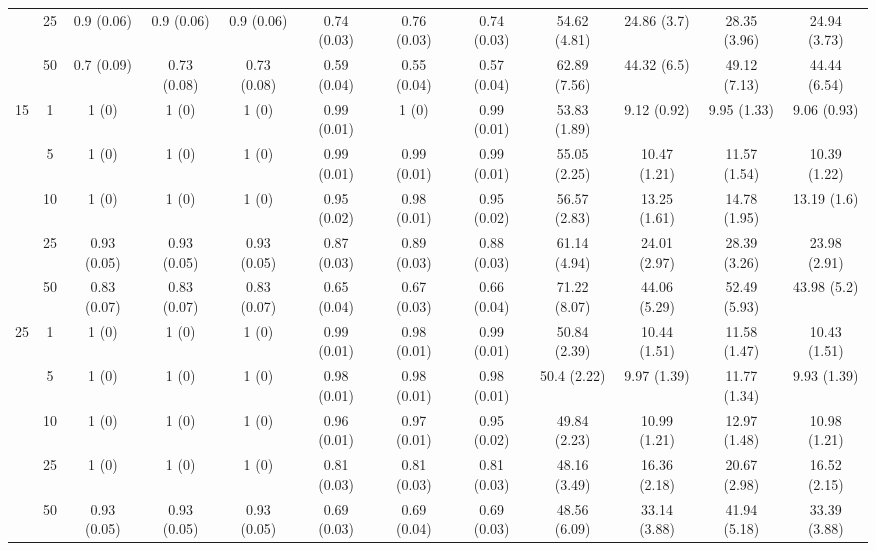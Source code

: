 \documentclass[10pt]{article}
\theoremstyle{definition}
\begin{document}
\begin{table}[H]
\begin{center}
{\begin{tabular}{cc|ccc|ccc|cccc|}
  & 25  & 0.9 (0.06) & 0.9 (0.06) & 0.9 (0.06) & 0.74 (0.03) & 0.76 (0.03) & 0.74 (0.03) & 54.62 (4.81) & 24.86 (3.7) & 28.35 (3.96) & 24.94 (3.73) \\ 
  & 50  & 0.7 (0.09) & 0.73 (0.08) & 0.73 (0.08) & 0.59 (0.04) & 0.55 (0.04) & 0.57 (0.04) & 62.89 (7.56) & 44.32 (6.5) & 49.12 (7.13) & 44.44 (6.54) \\[.3cm] 
 \multirow{5}{*}{15} & 1  & 1 (0) & 1 (0) & 1 (0) & 0.99 (0.01) & 1 (0) & 0.99 (0.01) & 53.83 (1.89) & 9.12 (0.92) & 9.95 (1.33) & 9.06 (0.93) \\ 
  & 5  & 1 (0) & 1 (0) & 1 (0) & 0.99 (0.01) & 0.99 (0.01) & 0.99 (0.01) & 55.05 (2.25) & 10.47 (1.21) & 11.57 (1.54) & 10.39 (1.22) \\ 
  & 10  & 1 (0) & 1 (0) & 1 (0) & 0.95 (0.02) & 0.98 (0.01) & 0.95 (0.02) & 56.57 (2.83) & 13.25 (1.61) & 14.78 (1.95) & 13.19 (1.6) \\ 
  & 25  & 0.93 (0.05) & 0.93 (0.05) & 0.93 (0.05) & 0.87 (0.03) & 0.89 (0.03) & 0.88 (0.03) & 61.14 (4.94) & 24.01 (2.97) & 28.39 (3.26) & 23.98 (2.91) \\ 
  & 50  & 0.83 (0.07) & 0.83 (0.07) & 0.83 (0.07) & 0.65 (0.04) & 0.67 (0.03) & 0.66 (0.04) & 71.22 (8.07) & 44.06 (5.29) & 52.49 (5.93) & 43.98 (5.2) \\[.3cm] 
 \multirow{5}{*}{25} & 1  & 1 (0) & 1 (0) & 1 (0) & 0.99 (0.01) & 0.98 (0.01) & 0.99 (0.01) & 50.84 (2.39) & 10.44 (1.51) & 11.58 (1.47) & 10.43 (1.51) \\ 
  & 5  & 1 (0) & 1 (0) & 1 (0) & 0.98 (0.01) & 0.98 (0.01) & 0.98 (0.01) & 50.4 (2.22) & 9.97 (1.39) & 11.77 (1.34) & 9.93 (1.39) \\ 
  & 10  & 1 (0) & 1 (0) & 1 (0) & 0.96 (0.01) & 0.97 (0.01) & 0.95 (0.02) & 49.84 (2.23) & 10.99 (1.21) & 12.97 (1.48) & 10.98 (1.21) \\ 
  & 25  & 1 (0) & 1 (0) & 1 (0) & 0.81 (0.03) & 0.81 (0.03) & 0.81 (0.03) & 48.16 (3.49) & 16.36 (2.18) & 20.67 (2.98) & 16.52 (2.15) \\ 
    & 50  & 0.93 (0.05) & 0.93 (0.05) & 0.93 (0.05) & 0.69 (0.03) & 0.69 (0.04) & 0.69 (0.03) & 48.56 (6.09) & 33.14 (3.88) & 41.94 (5.18) & 33.39 (3.88) \\
\end{tabular}}
   \end{center}
      \vspace{-.5cm}
\end{table}
\end{document}
